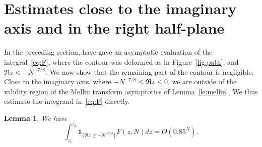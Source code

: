 \documentclass[a4paper]{amsart}
\newtheorem{lemma}[theorem]{Lemma}
\begin{document}
\section{Estimates close to the imaginary axis and in the right
half-plane}\label{se:right}

In the preceding section, have gave an asymptotic evaluation of the
integral~\eqref{eq:F}, where the contour was deformed as in 
Figure~\ref{fig:path}, and $\Re z < -N^{-7/8}$. We now show that
the remaining part of the contour is negligible.
Close to the imaginary axis, where $-N^{-7/8} \leq \Re z \leq 0$,
we are outside of the validity region of the Mellin transform asymptotics
of Lemma~\ref{le:mellin}. We thus estimate the integrand
in~\eqref{eq:F} directly.
%
\begin{lemma}\label{le:iR}
  We have
  \[
    \int_{z_1}^{z_2} \mathbf{1}_{\{\Re z \geq -N^{-7/8}\}}F(z,N) dz = O(0.85^N).
  \]
\end{lemma}
\end{document}
